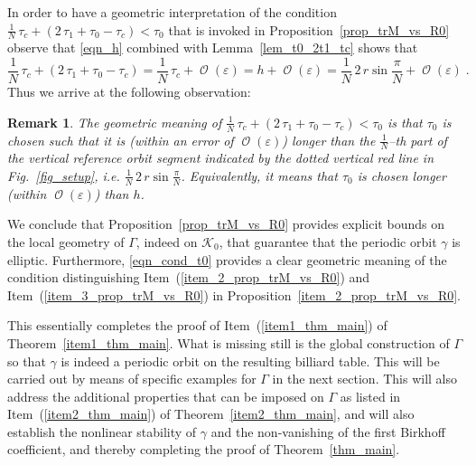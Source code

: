 \documentclass{amsart}
\theoremstyle{plain} %
\newtheorem{remark}[theorem]{Remark}
\begin{document}
In order to have a geometric interpretation of the condition
$
\frac{1}{N}\,\tau_c
+
(2\,\tau_1 + \tau_0 - \tau_c)
<
\tau_0
$
that is invoked in Proposition~\ref{prop_trM_vs_R0}
observe that \eqref{eqn_h} combined with Lemma~\ref{lem_t0_2t1_tc}
shows that
\begin{equation}
  \label{eqn_cond_t0}
  \frac{1}{N}\,\tau_c
  +
  (2\,\tau_1 + \tau_0 - \tau_c)
  =
  \frac{1}{N}\,\tau_c + \operatorname{\mathcal{O}}(\varepsilon)
  =
  h + \operatorname{\mathcal{O}}(\varepsilon)
  =
  \frac{1}{N}\,2\,r \sin\frac{\pi}{N}
  +
  \operatorname{\mathcal{O}}(\varepsilon)
  \;.
\end{equation}
Thus we arrive at the following
observation:
\begin{remark}
  \label{rem_trM_vs_R0_cond}
  The geometric meaning of
  $
  \frac{1}{N}\,\tau_c
  +
  (2\,\tau_1 + \tau_0 - \tau_c)
  <
  \tau_0
  $
  is that $\tau_0$ is chosen such that
  it is (within an error of $\operatorname{\mathcal{O}}(\varepsilon)$)
  longer than the $\frac{1}{N}$--th part of the vertical reference
  orbit segment indicated by the dotted vertical red line in
  Fig.~\ref{fig_setup}, i.e. $\frac{1}{N}\,2\,r \sin\frac{\pi}{N}$.
  Equivalently, it means that $\tau_0$
  is chosen longer (within $\operatorname{\mathcal{O}}(\varepsilon)$) than $h$.
\end{remark}


We conclude that Proposition~\ref{prop_trM_vs_R0} provides explicit bounds
on the local geometry of $\Gamma$, indeed on
${\mathcal K}_0$, that guarantee that the periodic orbit
$\gamma$ is elliptic. Furthermore, \eqref{eqn_cond_t0} provides
a clear geometric meaning of the condition distinguishing
Item~(\ref{item_2_prop_trM_vs_R0}) and Item~(\ref{item_3_prop_trM_vs_R0})
in Proposition~\ref{item_2_prop_trM_vs_R0}.

This essentially completes the proof of
Item~(\ref{item1_thm_main}) of Theorem~\ref{item1_thm_main}. What is missing
still is the global construction of $\Gamma$ so that
$\gamma$ is indeed a periodic orbit on the resulting billiard table.
This will be carried out by means of specific examples for
$\Gamma$ in the next
section. This will also address the additional properties that
can be imposed on $\Gamma$ as listed in
Item~(\ref{item2_thm_main}) of Theorem~\ref{item2_thm_main}, and will
also establish the nonlinear stability of $\gamma$
and the non-vanishing of the first Birkhoff coefficient, and thereby
completing the proof of Theorem~\ref{thm_main}.
\end{document}
